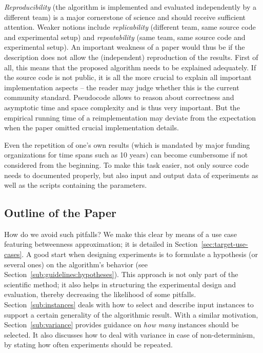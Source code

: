 \documentclass[algorithms,article,submit,moreauthors,pdftex]{Definitions/mdpi}
\newcounter{guideline}
\newcommand{\removed}[1]{}
\begin{document}
\emph{Reproducibility} (the algorithm is implemented and evaluated independently by a different team)
is a major cornerstone of science and should receive sufficient attention.
Weaker notions include \emph{replicability} (different team, same source code and experimental setup)
and \emph{repeatability} (same team, same source code and experimental setup).
An important weakness of a paper would thus be if the description does not
allow the (independent) reproduction of the results.
First of all, this means that the proposed algorithm
needs to be explained adequately.
If the source code is not public, it is all the more
crucial to explain all important implementation aspects
-- the reader may judge whether this is the current community standard.
Pseudocode allows to reason about correctness and asymptotic time and space complexity and is thus
very important.
But the empirical running time of a reimplementation
may deviate from the expectation when the paper omitted
crucial implementation details.

Even the repetition of one's own results (which is mandated by major funding organizations for time spans such as 10 years)
can become cumbersome if not considered from the beginning.
To make this task easier, not only source code needs to documented properly,
but also input and output data of experiments as well as the scripts containing the parameters.
\removed{Probably every reader has heard about this one project where this
documentation part has been neglected to some extent...}

\subsection{Outline of the Paper}
\label{par:outline}
%
How do we avoid such pitfalls? We make this clear by means of a use case featuring betweenness approximation;
it is detailed in Section~\ref{sec:target-use-cases}.
%
A good start when designing experiments is to formulate a hypothesis (or several ones) on the algorithm's behavior
(see Section~\ref{sub:guidelines:hypotheses}).
This approach is not only part of the scientific method;
 it also helps in structuring the experimental design
and evaluation, thereby decreasing the likelihood of some pitfalls.
%
Section~\ref{sub:instances} deals with how to select and describe input instances to support a certain
generality of the algorithmic result.
With a similar motivation, Section~\ref{sub:variance} provides guidance on \emph{how many} instances should be selected.
It also discusses how to deal with variance in case of non-determinism, \eg by stating how
often experiments should be repeated.
\end{document}
